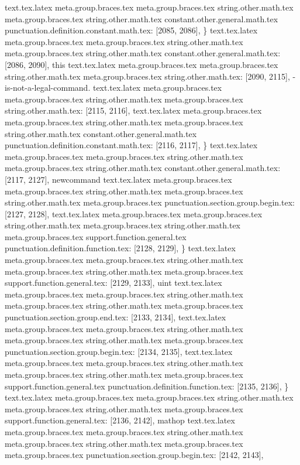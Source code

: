 {{{{{{{{{{{{{{{{{{{{{{{{{{{{{{{{{{{{{{{{{{{{{{{{{{text.tex.latex meta.group.braces.tex meta.group.braces.tex string.other.math.tex meta.group.braces.tex string.other.math.tex constant.other.general.math.tex punctuation.definition.constant.math.tex: [2085, 2086], {\}
text.tex.latex meta.group.braces.tex meta.group.braces.tex string.other.math.tex meta.group.braces.tex string.other.math.tex constant.other.general.math.tex: [2086, 2090], {this}
text.tex.latex meta.group.braces.tex meta.group.braces.tex string.other.math.tex meta.group.braces.tex string.other.math.tex: [2090, 2115], {-is-not-a-legal-command.
}
text.tex.latex meta.group.braces.tex meta.group.braces.tex string.other.math.tex meta.group.braces.tex string.other.math.tex: [2115, 2116], {
}
text.tex.latex meta.group.braces.tex meta.group.braces.tex string.other.math.tex meta.group.braces.tex string.other.math.tex constant.other.general.math.tex punctuation.definition.constant.math.tex: [2116, 2117], {\}
text.tex.latex meta.group.braces.tex meta.group.braces.tex string.other.math.tex meta.group.braces.tex string.other.math.tex constant.other.general.math.tex: [2117, 2127], {newcommand}
text.tex.latex meta.group.braces.tex meta.group.braces.tex string.other.math.tex meta.group.braces.tex string.other.math.tex meta.group.braces.tex punctuation.section.group.begin.tex: [2127, 2128], {{}
text.tex.latex meta.group.braces.tex meta.group.braces.tex string.other.math.tex meta.group.braces.tex string.other.math.tex meta.group.braces.tex support.function.general.tex punctuation.definition.function.tex: [2128, 2129], {\}
text.tex.latex meta.group.braces.tex meta.group.braces.tex string.other.math.tex meta.group.braces.tex string.other.math.tex meta.group.braces.tex support.function.general.tex: [2129, 2133], {uint}
text.tex.latex meta.group.braces.tex meta.group.braces.tex string.other.math.tex meta.group.braces.tex string.other.math.tex meta.group.braces.tex punctuation.section.group.end.tex: [2133, 2134], {}}
text.tex.latex meta.group.braces.tex meta.group.braces.tex string.other.math.tex meta.group.braces.tex string.other.math.tex meta.group.braces.tex punctuation.section.group.begin.tex: [2134, 2135], {{}
text.tex.latex meta.group.braces.tex meta.group.braces.tex string.other.math.tex meta.group.braces.tex string.other.math.tex meta.group.braces.tex support.function.general.tex punctuation.definition.function.tex: [2135, 2136], {\}
text.tex.latex meta.group.braces.tex meta.group.braces.tex string.other.math.tex meta.group.braces.tex string.other.math.tex meta.group.braces.tex support.function.general.tex: [2136, 2142], {mathop}
text.tex.latex meta.group.braces.tex meta.group.braces.tex string.other.math.tex meta.group.braces.tex string.other.math.tex meta.group.braces.tex meta.group.braces.tex punctuation.section.group.begin.tex: [2142, 2143], {{}
}}}}}}}}}}}}}}}}}}}}}}}}}}}}}}}}}}}}}}}}}}}}}}}}}}}}}}}}

